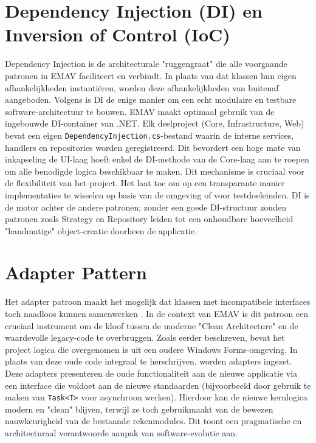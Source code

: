 \section{Dependency Injection (DI) en Inversion of Control (IoC)}
Dependency Injection is de architecturale "ruggengraat" die alle voorgaande patronen in EMAV faciliteert en verbindt. 
In plaats van dat klassen hun eigen afhankelijkheden instantiëren, worden deze afhankelijkheden van buitenaf aangeboden. Volgens \textcite{seemann2019di} is DI de enige manier om een echt modulaire en testbare software-architectuur te bouwen.
EMAV maakt optimaal gebruik van de ingebouwde DI-container van .NET. 
Elk deelproject (Core, Infrastructure, Web) bevat een eigen \texttt{DependencyInjection.cs}-bestand waarin de interne services, handlers en repositories worden geregistreerd. 
Dit bevordert een hoge mate van inkapseling\: de UI-laag hoeft enkel de DI-methode van de Core-laag aan te roepen om alle benodigde logica beschikbaar te maken.
Dit mechanisme is cruciaal voor de flexibiliteit van het project. 
Het laat toe om op een transparante manier implementaties te wisselen op basis van de omgeving of voor testdoeleinden. 
DI is de motor achter de andere patronen; zonder een goede DI-structuur zouden patronen zoals Strategy en Repository leiden tot een onhoudbare hoeveelheid "handmatige" object-creatie doorheen de applicatie.
\section{Adapter Pattern}
Het adapter patroon maakt het mogelijk dat klassen met incompatibele interfaces toch naadloos kunnen samenwerken \autocite{gof1994}. 
In de context van EMAV is dit patroon een cruciaal instrument om de kloof tussen de moderne "Clean Architecture" en de waardevolle legacy-code te overbruggen. 
Zoals eerder beschreven, bevat het project logica die overgenomen is uit een oudere Windows Forms-omgeving.
In plaats van deze oude code integraal te herschrijven, worden adapters ingezet. 
Deze adapters presenteren de oude functionaliteit aan de nieuwe applicatie via een interface die voldoet aan de nieuwe standaarden (bijvoorbeeld door gebruik te maken van \texttt{Task<T>} voor asynchroon werken). 
Hierdoor kan de nieuwe kernlogica modern en "clean" blijven, terwijl ze toch gebruikmaakt van de bewezen nauwkeurigheid van de bestaande rekenmodules. 
Dit toont een pragmatische en architecturaal verantwoorde aanpak van software-evolutie aan.
